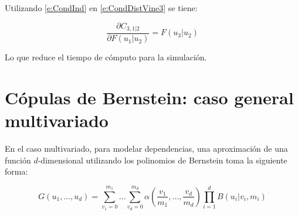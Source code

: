 Utilizando \ref{e:CondInd} en \ref{e:CondDistVine3} se tiene:

\begin{equation}
\frac{\partial C_{3,1|2}}{\partial F(u_1|u_2)} = F(u_3|u_2)
\label{e:marginalInd} %
\end{equation}

Lo que reduce el tiempo de c\'omputo para la simulaci\'on.

%
%

\section{C\'{o}pulas de Bernstein: caso general multivariado}
 


En el caso multivariado, para modelar dependencias, una aproximaci\'{o}n de una funci\'{o}n $d$-dimensional utilizando los polinomios de Bernstein toma la siguiente forma:

\begin{equation}
	G(u_1, \ldots, u_d) =
	\sum_{v_1 = 0}^{m_1} \dots \sum_{v_d = 0}^{m_d}
	\alpha
	\left(
		\frac{v_1}{m_1}, \ldots, \frac{v_d}{m_d}
	\right)
	\prod_{i = 1}^{d} B(u_i|v_i,m_i)
\label{e:BernPoly}
\end{equation}

